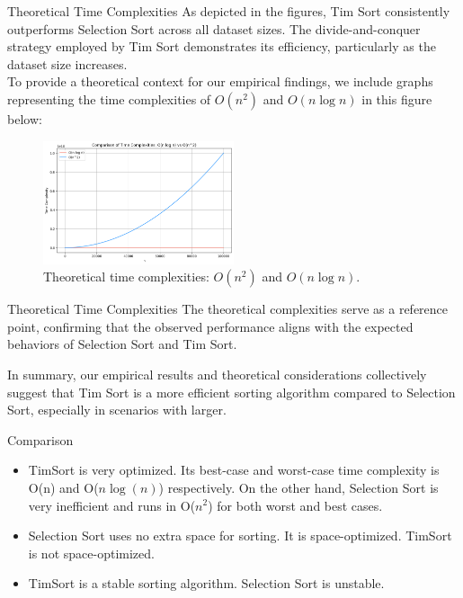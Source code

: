 \documentclass[aspectratio=169]{beamer}
\begin{document}
    
    \begin{frame}{Theoretical Time Complexities}
        As depicted in the figures, Tim Sort consistently outperforms Selection Sort across all dataset sizes. The divide-and-conquer strategy employed by Tim Sort demonstrates its efficiency, particularly as the dataset size increases.\\    
        To provide a theoretical context for our empirical findings, we include graphs representing the time complexities of \(O(n^2)\) and \(O(n \log n)\) in this figure below:
    \\
    \begin{figure}[h]
  \centering
  \includegraphics[width=0.5\textwidth]{Images/actual_Function.png}
  \caption{Theoretical time complexities: \(O(n^2)\) and \(O(n \log n)\).}
  \label{fig:theoretical_complexities}
\end{figure}
    \end{frame}
    \begin{frame}{Theoretical Time Complexities}
    The theoretical complexities serve as a reference point, confirming that the observed performance aligns with the expected behaviors of Selection Sort and Tim Sort.\newline

In summary, our empirical results and theoretical considerations collectively suggest that Tim Sort is a more efficient sorting algorithm compared to Selection Sort, especially in scenarios with larger.\newline\\
    \end{frame}

    \begin{frame}{Comparison}
   
    \begin{itemize}
	\item TimSort is very optimized. Its best-case and worst-case time complexity is O(n) and O($n\log(n)$) respectively. On the other hand, Selection Sort is very inefficient and runs in O($n^2$) for both worst and best cases.
	\item Selection Sort uses no extra space for sorting. It is space-optimized. TimSort is not space-optimized.
	\item TimSort is a stable sorting algorithm. Selection Sort is unstable.
    \end{itemize}
        
    \end{frame}
\end{document}
